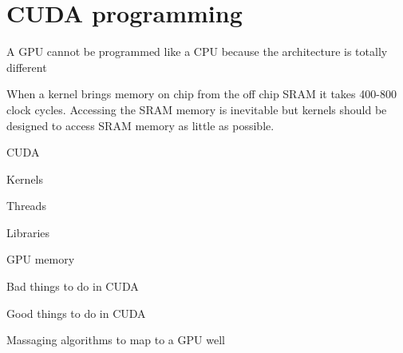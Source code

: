 \section{CUDA programming}
A GPU cannot be programmed like a CPU because the architecture is totally different

When a kernel brings memory on chip from the off chip SRAM it takes 400-800 clock cycles.
Accessing the SRAM memory is inevitable but kernels should be designed to access SRAM memory as little as possible.



CUDA

Kernels

Threads

Libraries

GPU memory

Bad things to do in CUDA

Good things to do in CUDA

Massaging algorithms to map to a GPU well


